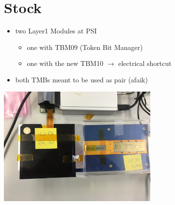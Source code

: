 \documentclass[9pt]{beamer}
\begin{document}
\section{Stock}
\begin{frame}
	\begin{itemize}
		\item two Layer1 Modules at PSI
		\begin{itemize}
			\item one with TBM09 (Token Bit Manager)
			\item one with the new TBM10 $\rightarrow$ electrical shortcut
		\end{itemize}
		\item both TMBs meant to be used as pair (afaik)
	\end{itemize}
	\begin{center}
		\includegraphics[width=8cm]{bothMod}
	\end{center}
\end{frame}
\end{document}
